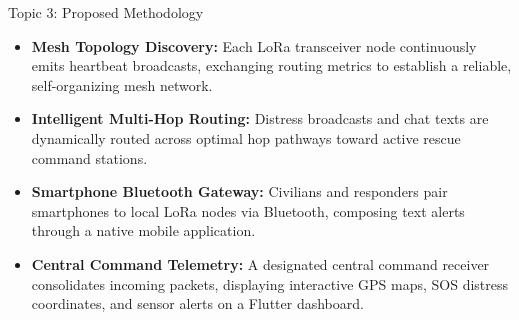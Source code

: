 \documentclass{beamer}
\begin{document}
\begin{frame}{Topic 3: Proposed Methodology}
\begin{itemize}
  \item \textbf{Mesh Topology Discovery:} Each LoRa transceiver node continuously emits heartbeat broadcasts, exchanging routing metrics to establish a reliable, self-organizing mesh network.
  \vspace{0.25cm}
  \item \textbf{Intelligent Multi-Hop Routing:} Distress broadcasts and chat texts are dynamically routed across optimal hop pathways toward active rescue command stations.
  \vspace{0.25cm}
  \item \textbf{Smartphone Bluetooth Gateway:} Civilians and responders pair smartphones to local LoRa nodes via Bluetooth, composing text alerts through a native mobile application.
  \vspace{0.25cm}
  \item \textbf{Central Command Telemetry:} A designated central command receiver consolidates incoming packets, displaying interactive GPS maps, SOS distress coordinates, and sensor alerts on a Flutter dashboard.
\end{itemize}
\end{frame}
\end{document}
